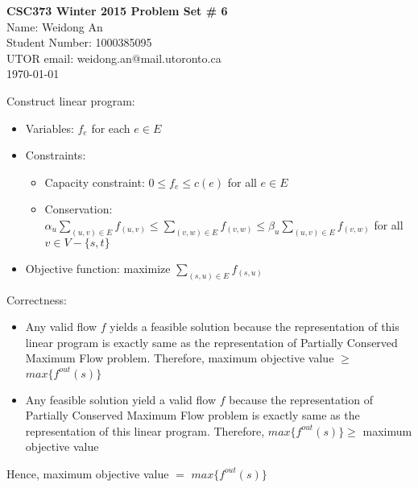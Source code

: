 \documentclass[11pt]{article}
\begin{document}
\begin{center}
{\bf \Large \bf CSC373 Winter 2015 Problem Set \# 6}\\
Name: Weidong An\\
Student Number: 1000385095\\
UTOR email: weidong.an@mail.utoronto.ca\\
\today\\
\end{center}
Construct linear program:
\begin{itemize}
\item
Variables: $f_e$ for each $e\in E$
\item
Constraints:
\begin{itemize}
\item
Capacity constraint: $0\leq f_e \leq c(e)$ for all $e \in E$
\item
Conservation: $\alpha_u \sum_{(u,v)\in E} f_{(u,v)}\leq \sum_{(v,w)\in E} f_{(v,w)}\leq \beta_u \sum_{(u,v)\in E} f_{(v,w)}$ for all $v \in V-\{s, t\}$
\end{itemize}
\item
Objective function: maximize $\sum_{(s ,u)\in E} f_{(s,u)}$

\end{itemize}
Correctness:
\begin{itemize}
\item
Any valid flow $f$ yields a feasible solution because the representation of this linear program is exactly same as the representation of Partially Conserved Maximum Flow problem. Therefore, maximum objective value $\geq$ $ max \{f^{out} (s)\}$
\item
Any feasible solution yield a valid flow $f$ because the representation of Partially Conserved Maximum Flow problem is exactly same as the representation of this linear program. Therefore, $max \{f^{out} (s)\}\geq$ maximum objective value

\end{itemize}
Hence,  maximum objective value $=$ $ max \{f^{out} (s)\}$
\end{document}

